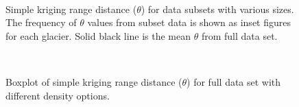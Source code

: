 \documentclass[12pt]{article}
\begin{document}
\begin{landscape}
\begin{figure}[H]
	\centering
	\\
	\caption{Simple kriging range distance ($\theta$) for data subsets with various sizes. The frequency of $\theta$ values from subset data is shown as inset figures for each glacier. Solid black line is the mean $\theta$ from full data set.}
	\label{fig:Subset_theta}
\end{figure}
\end{landscape}

\begin{figure}[H]
	\centering
	\\
	\caption{Boxplot of simple kriging range distance ($\theta$) for full data set with different density options.}
	\label{fig:FullData_theta}
\end{figure}



\end{document}
